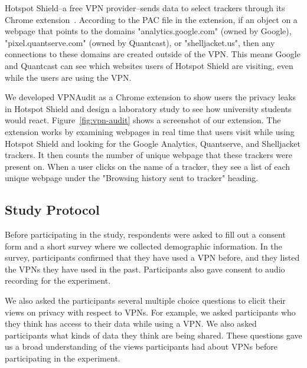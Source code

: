 Hotspot Shield--a free VPN provider--sends data to select trackers through its Chrome extension~\cite{windscribe-hotspot-shield}.  According to the PAC  file in the extension, if an object on a webpage that points to the domains "analytics.google.com" (owned by Google), "pixel.quantserve.com" (owned by Quantcast), or "shelljacket.us", then any connections to these domains are created outside of the VPN.
 
This means Google and Quantcast can see which websites users of Hotspot Shield are visiting, even while the users are using the VPN. 

We developed VPNAudit as a Chrome extension to show users the privacy leaks in Hotspot Shield and design a laboratory study to see how university students would react.
Figure~\ref{fig:vpn-audit} shows a screenshot of our extension.
The extension works by examining webpages in real time that users visit while using Hotspot Shield and looking for the Google Analytics, Quantserve, and Shelljacket trackers.
It then counts the number of unique webpage that these trackers were present on.
When a user clicks on the name of a tracker, they see a list of each unique webpage under the "Browsing history sent to tracker" heading. 

\subsection{Study Protocol} 
Before participating in the study, respondents were asked to fill out a consent form and a short survey where we collected demographic information.
In the survey, participants confirmed that they have used a VPN before, and they listed the VPNs they have used in the past.
Participants also gave consent to audio recording for the experiment.

We also asked the participants several multiple choice questions to elicit their views on privacy with respect to VPNs.
For example, we asked participants who they think has access to their data while using a VPN.
We also asked participants what kinds of data they think are being shared.
These questions gave us a broad understanding of the views participants had about VPNs before participating in the experiment.

